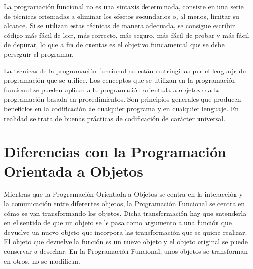 La programación funcional no es una sintaxis determinada, consiste en una serie de técnicas orientadas a eliminar los efectos secundarios o, al menos, limitar su alcance. Si se utilizan estas técnicas de manera adecuada, se consigue escribir código más fácil de leer, más correcto, más seguro, más fácil de probar y más fácil de depurar, lo que a fin de cuentas es el objetivo fundamental que se debe perseguir al programar. 

La técnicas de la programación funcional no están restringidas por el lenguaje de programación que se utilice. Los conceptos que se utilizan en la programación funcional se pueden aplicar a la programación orientada a objetos o a la programación basada en procedimientos. Son principios generales que producen beneficios en la codificación de cualquier programa y en cualquier lenguaje. En realidad se trata de buenas prácticas de codificación de carácter universal.

\section{Diferencias con la Programación Orientada a Objetos}
\noindent Mientras que la Programación Orientada a Objetos se centra en la interacción y la comunicación entre diferentes objetos, la Programación Funcional se centra en cómo se van transformando los objetos. Dicha transformación hay que entenderla en el sentido de que un objeto se le pasa como argumento a una función que devuelve un nuevo objeto que incorpora las transformación que se quiere realizar. El objeto que devuelve la función es un nuevo objeto y el objeto original se puede conservar o desechar. En la Programación Funcional, unos objetos se transforman en otros, no se modifican.

\vspace{2em}
   
